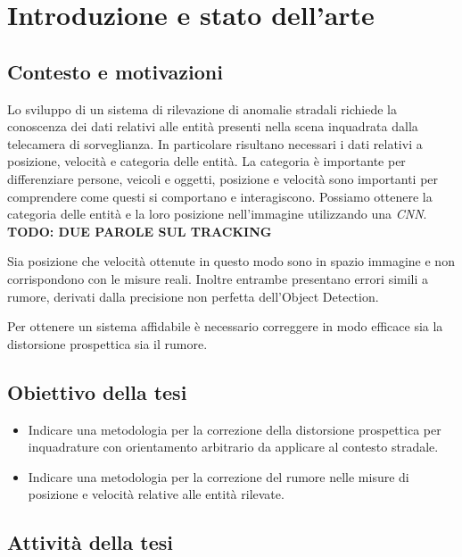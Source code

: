 \chapter{Introduzione e stato dell'arte}
\label{sec:introduzione}


\section{Contesto e motivazioni}

Lo sviluppo di un sistema di rilevazione di anomalie stradali richiede la conoscenza dei dati relativi alle entità presenti nella scena inquadrata dalla telecamera di sorveglianza.
In particolare risultano necessari i dati relativi a posizione, velocità e categoria delle entità.
La categoria è importante per differenziare persone, veicoli e oggetti, posizione e velocità sono importanti per comprendere come questi si comportano e interagiscono.
Possiamo ottenere la categoria delle entità e la loro posizione nell'immagine utilizzando una \emph{CNN}.
\textbf{TODO: DUE PAROLE SUL TRACKING}

Sia posizione che velocità ottenute in questo modo sono in spazio immagine e non corrispondono con le misure reali.
Inoltre entrambe presentano errori simili a rumore, derivati dalla precisione non perfetta dell'Object Detection.

Per ottenere un sistema affidabile è necessario correggere in modo efficace sia la distorsione prospettica sia il rumore.

\section{Obiettivo della tesi}
\begin{itemize}
	\item Indicare una metodologia per la correzione della distorsione prospettica per inquadrature con orientamento arbitrario da applicare al contesto stradale.
	\item Indicare una metodologia per la correzione del rumore nelle misure di posizione e velocità relative alle entità rilevate.
\end{itemize}

\section{Attività della tesi}


